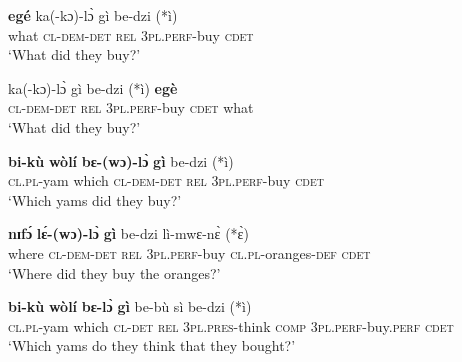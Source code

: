 \documentclass[output=paper]{langscibook}
\begin{document}
\ea \label{ex:devlin:rc-noun-class}
\begin{xlist}
\ex \label{ex:devlin:nc-dem-det}
\gll \textbf{eg\'{e}} ka(-kɔ)-l\`{ɔ} g\`{i} be-dzi (*\`{i})\\
what \textsc{cl}-\textsc{dem}-\textsc{det} \textsc{rel} \textsc{3pl.perf}-buy \textsc{cdet}  \\
\glt `What did they buy?’

\ex \label{ex:devlin:nc-dem-det-no-insitu}
\gll *ka(-kɔ)-l\`{ɔ} g\`{i} be-dzi (*\`{i}) \textbf{eg\`{e}} \\
\textsc{cl}-\textsc{dem}-\textsc{det} \textsc{rel} \textsc{3pl.perf}-buy \textsc{cdet} what   \\
\glt `What did they buy?’

\ex \label{ex:devlin:nc-dem-det-which}
\gll \textbf{bi-k\`{u}} \textbf{w\`{o}l\'{i}} \textbf{bɛ-(wɔ)-l\`{ɔ}} \textbf{g\`{i}} be-dzi (*\`{i}) \\
\textsc{cl.pl}-yam which \textsc{cl}-\textsc{dem}-\textsc{det} \textsc{rel} \textsc{3pl.perf}-buy \textsc{cdet} \\
\glt `Which yams did they buy?’

\ex \label{ex:devlin:nc-dem-det-where}
\gll \textbf{nɪf\'{ɔ}} \textbf{l\'{ɛ}-(wɔ)-l\`{ɔ}} \textbf{g\`{i}} be-dzi l\`{i}-mwɛ-n\`{ɛ} (*\`{ɛ})\\
where \textsc{cl}-\textsc{dem}-\textsc{det} \textsc{rel} \textsc{3pl.perf}-buy \textsc{cl.pl}-oranges-\textsc{def} \textsc{cdet}\\
\glt `Where did they buy the oranges?’

\ex \label{ex:devlin:nc-dem-det-embed}
\gll \textbf{bi-k\`{u}} \textbf{w\`{o}l\'{i}} \textbf{bɛ-l\`{ɔ}} \textbf{g\`{i}} be-b\`{u} s\`{i} be-dzi (*\`{i})\\
\textsc{cl.pl}-yam which \textsc{cl}-\textsc{det} \textsc{rel} \textsc{3pl.pres}-think \textsc{comp} 3\textsc{pl.perf}-buy.\textsc{perf} \textsc{cdet}\\
\glt `Which yams do they think that they bought?’
\end{xlist}
\z
\end{document}
